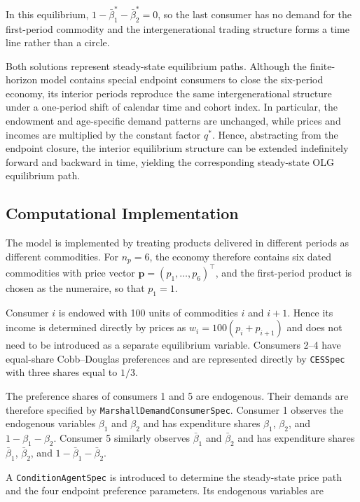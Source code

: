 \documentclass[
  letterpaper,
  DIV=11,
  numbers=noendperiod]{scrreprt}
\begin{document}
In this equilibrium, \(1-\bar\beta_1^*-\bar\beta_2^*=0\), so the last
consumer has no demand for the first-period commodity and the
intergenerational trading structure forms a time line rather than a
circle.

Both solutions represent steady-state equilibrium paths. Although the
finite-horizon model contains special endpoint consumers to close the
six-period economy, its interior periods reproduce the same
intergenerational structure under a one-period shift of calendar time
and cohort index. In particular, the endowment and age-specific demand
patterns are unchanged, while prices and incomes are multiplied by the
constant factor \(q^*\). Hence, abstracting from the endpoint closure,
the interior equilibrium structure can be extended indefinitely forward
and backward in time, yielding the corresponding steady-state OLG
equilibrium path.

\subsection{Computational
Implementation}\label{computational-implementation}

The model is implemented by treating products delivered in different
periods as different commodities. For \(n_p=6\), the economy therefore
contains six dated commodities with price vector
\(\mathbf p=(p_1,\ldots,p_6)^\top\), and the first-period product is
chosen as the numeraire, so that \(p_1=1\).

Consumer \(i\) is endowed with 100 units of commodities \(i\) and
\(i+1\). Hence its income is determined directly by prices as
\(w_i=100(p_i+p_{i+1})\) and does not need to be introduced as a
separate equilibrium variable. Consumers 2--4 have equal-share
Cobb--Douglas preferences and are represented directly by
\texttt{CESSpec} with three shares equal to \(1/3\).

The preference shares of consumers 1 and 5 are endogenous. Their demands
are therefore specified by \texttt{MarshallDemandConsumerSpec}. Consumer
1 observes the endogenous variables \(\beta_1\) and \(\beta_2\) and has
expenditure shares \(\beta_1\), \(\beta_2\), and \(1-\beta_1-\beta_2\).
Consumer 5 similarly observes \(\bar\beta_1\) and \(\bar\beta_2\) and
has expenditure shares \(\bar\beta_1\), \(\bar\beta_2\), and
\(1-\bar\beta_1-\bar\beta_2\).

A \texttt{ConditionAgentSpec} is introduced to determine the
steady-state price path and the four endpoint preference parameters. Its
endogenous variables are
\end{document}
